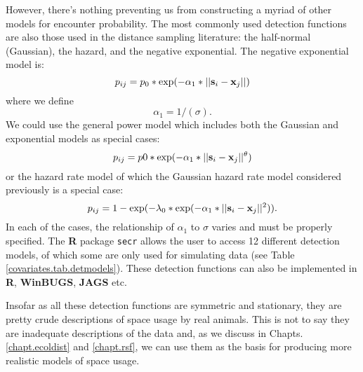 However, there's nothing preventing us from constructing a myriad of
other models for encounter probability.
The most
commonly used detection functions are also those used in the distance
sampling literature: the half-normal (Gaussian), the hazard, and the negative
exponential.  The negative exponential model is: 
\[
p_{ij} = p_{0}*\exp(-\alpha_{1} *||{\bf s}_{i}-{\bf x}_{j}||)
\]
where we define
\[
\alpha_{1} = 1/(\sigma).
\]
We could use the general power model \citep{russell_etal:2012} which includes both the
Gaussian and exponential models as special cases:
\[
p_{ij} = p0*\exp(-\alpha_{1} *||{\bf s}_{i}-{\bf x}_{j}||^{\theta} )
\]
or the hazard rate model \citep{hayes_buckland:1983} of which the
Gaussian hazard rate model considered previously is a
special case: 
\[
p_{ij} = 1-\exp(-\lambda_{0}* \exp(-\alpha_{1} *||{\bf s}_{i}-{\bf
  x}_{j}||^{2}) ).
\]
In each of the cases, the relationship of $\alpha_1$ to $\sigma$ varies and must
be properly specified.  The {\bf R} package
{\tt secr} allows the user to access 12 different detection models, of which
some are only used for simulating data (see Table \ref{covariates.tab.detmodels}). These detection
functions can also be implemented in {\bf R}, {\bf WinBUGS},
{\bf JAGS} etc.

Insofar as all these detection functions are symmetric and stationary, they are pretty
crude descriptions of space usage by real animals. This is not to
say they are inadequate descriptions of the data and, as we discuss in
Chapts. \ref{chapt.ecoldist} and \ref{chapt.rsf}, we can use them as the
basis for producing more realistic models of space usage.  


